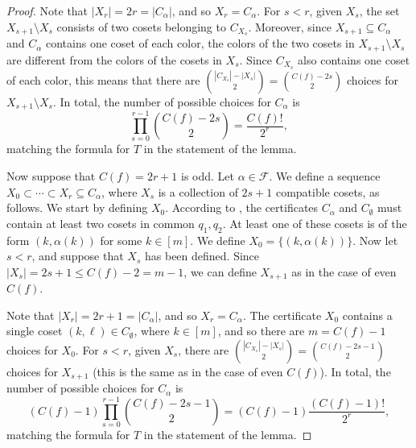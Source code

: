 \documentclass[10pt,a4paper]{article}
\theoremstyle{definition}
\begin{document}
\begin{proof}
Note that $|X_r| = 2r = |C_\alpha|$, and so $X_r = C_\alpha$. For $s < r$, given $X_s$, the set $X_{s+1} \setminus X_s$ consists of two cosets belonging to $C_{X_s}$. Moreover, since $X_{s+1} \subseteq C_\alpha$ and $C_\alpha$ contains one coset of each color, the colors of the two cosets in $X_{s+1} \setminus X_s$ are different from the colors of the cosets in $X_s$. Since $C_{X_s}$ also contains one coset of each color, this means that there are $\binom{|C_{X_s}| - |X_s|}{2} = \binom{C(f) - 2s}{2}$ choices for $X_{s+1} \setminus X_s$. In total, the number of possible choices for $C_\alpha$ is
\[
 \prod_{s=0}^{r-1} \binom{C(f) - 2s}{2} =
 \frac{C(f)!}{2^r},
\]
matching the formula for $T$ in the statement of the lemma.

\smallskip

Now suppose that $C(f) = 2r+1$ is odd. Let $\alpha \in \mathcal{F}$. We define a sequence $X_0 \subset \cdots \subset X_r \subseteq C_\alpha$, where $X_s$ is a collection of $2s+1$ compatible cosets, as follows. We start by defining $X_0$. According to , the certificates $C_\alpha$ and $C_\emptyset$ must contain at least two cosets in common $q_1,q_2$. At least one of these cosets is of the form $(k,\alpha(k))$ for some $k \in [m]$. We define $X_0 = \{(k,\alpha(k))\}$. Now let $s < r$, and suppose that $X_s$ has been defined. Since $|X_s| = 2s+1 \leq C(f) - 2 = m - 1$, we can define $X_{s+1}$ as in the case of even $C(f)$.

Note that $|X_r| = 2r+1 = |C_\alpha|$, and so $X_r = C_\alpha$. The certificate $X_0$ contains a single coset $(k,\ell) \in C_\emptyset$, where $k \in [m]$, and so there are $m = C(f) - 1$ choices for $X_0$. For $s < r$, given $X_s$, there are $\binom{|C_{X_s}| - |X_s|}{2} = \binom{C(f) - 2s - 1}{2}$ choices for $X_{s+1}$ (this is the same as in the case of even $C(f)$). In total, the number of possible choices for $C_\alpha$ is
\[
 (C(f) - 1) \prod_{s=0}^{r-1} \binom{C(f) - 2s - 1}{2} =
 (C(f) - 1) \frac{(C(f) - 1)!}{2^r},
\]
matching the formula for $T$ in the statement of the lemma.
\end{proof}
\end{document}
